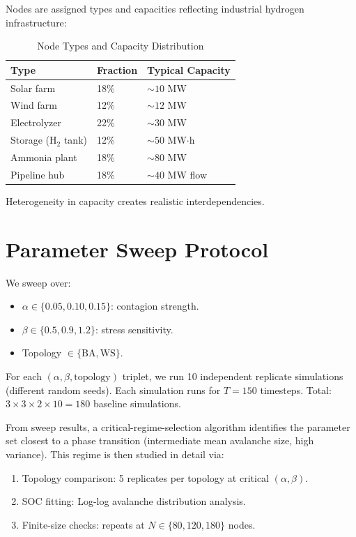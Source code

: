 \documentclass[12pt,a4paper,twoside]{report}
\begin{document}
Nodes are assigned types and capacities reflecting industrial hydrogen infrastructure:

\begin{table}[htbp]
\centering
\caption{Node Types and Capacity Distribution}
\begin{tabular}{lll}
\toprule
\textbf{Type} & \textbf{Fraction} & \textbf{Typical Capacity} \\
\midrule
Solar farm & 18\% & $\sim 10$ MW \\
Wind farm & 12\% & $\sim 12$ MW \\
Electrolyzer & 22\% & $\sim 30$ MW \\
Storage (H$_2$ tank) & 12\% & $\sim 50$ MW$\cdot$h \\
Ammonia plant & 18\% & $\sim 80$ MW \\
Pipeline hub & 18\% & $\sim 40$ MW flow \\
\bottomrule
\end{tabular}
\end{table}

Heterogeneity in capacity creates realistic interdependencies.

\section{Parameter Sweep Protocol}

We sweep over:
\begin{itemize}
\item $\alpha \in \{0.05, 0.10, 0.15\}$: contagion strength.
\item $\beta \in \{0.5, 0.9, 1.2\}$: stress sensitivity.
\item Topology $\in \{\text{BA}, \text{WS}\}$.
\end{itemize}

For each $({\alpha, \beta, \text{topology}})$ triplet, we run 10 independent replicate simulations (different random seeds). Each simulation runs for $T = 150$ timesteps. Total: $3 \times 3 \times 2 \times 10 = 180$ baseline simulations.

From sweep results, a critical-regime-selection algorithm identifies the parameter set closest to a phase transition (intermediate mean avalanche size, high variance). This regime is then studied in detail via:
\begin{enumerate}
\item Topology comparison: 5 replicates per topology at critical $(\alpha, \beta)$.
\item SOC fitting: Log-log avalanche distribution analysis.
\item Finite-size checks: repeats at $N \in \{80, 120, 180\}$ nodes.
\end{enumerate}
\end{document}
